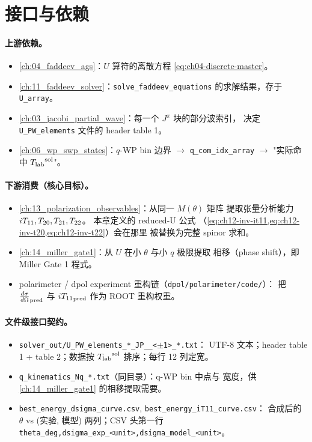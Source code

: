 \section{接口与依赖}
\label{sec:ch12-interface}

\paragraph{上游依赖。}
\begin{itemize}
  \item \cref{ch:04_faddeev_ags}：\(U\) 算符的离散方程
        \cref{eq:ch04-discrete-master}。
  \item \cref{ch:11_faddeev_solver}：\texttt{solve\_faddeev\_equations}
        的求解结果，存于 \texttt{U\_array}。
  \item \cref{ch:03_jacobi_partial_wave}：每一个 \(J^\pi\) 块的部分波索引，
        决定 \texttt{U\_PW\_elements} 文件的 header table 1。
  \item \cref{ch:06_wp_swp_states}：\(q\)-WP bin 边界 \(\to\) \texttt{q\_com\_idx\_array}
        \(\to\) "实际命中 \({T_{\text{lab}}}^{\rm sol}\)"。
\end{itemize}

\paragraph{下游消费（核心目标）。}
\begin{itemize}
  \item \cref{ch:13_polarization_observables}：从同一 \(M(\theta)\) 矩阵
        提取张量分析能力 \({i T_{11}}, {T_{20}}, {T_{21}}, {T_{22}}\)。
        本章定义的 reduced-U 公式
        （\cref{eq:ch12-inv-it11,eq:ch12-inv-t20,eq:ch12-inv-t22}）会在那里
        被替换为完整 spinor 求和。
  \item \cref{ch:14_miller_gate1}：从 \(U\) 在小 \(\theta\) 与小 \(q\) 极限提取
        相移（phase shift），即 Miller Gate 1 程式。
  \item polarimeter / dpol experiment 重构链（\texttt{dpol/polarimeter/code/}）：
        把 \(\frac{d\sigma}{d\Omega}_{\rm pred}\) 与 \({i T_{11}}_{\rm pred}\) 作为 ROOT
        重构权重。
\end{itemize}

\paragraph{文件级接口契约。}
\begin{itemize}
  \item \texttt{solver\_out/U\_PW\_elements\_*\_JP\_<2J>\_<\(\pm\)1>\_*.txt}：
        UTF-8 文本；header table 1 + table 2；数据按 \({T_{\text{lab}}}^{\rm sol}\)
        排序；每行 12 列定宽。
  \item \texttt{q\_kinematics\_Nq\_*.txt}（同目录）：q-WP bin 中点与
        宽度，供 \cref{ch:14_miller_gate1} 的相移提取需要。
  \item \texttt{best\_energy\_dsigma\_curve.csv}, \texttt{best\_energy\_iT11\_curve.csv}：
        合成后的 \(\theta\) vs (实验, 模型) 两列；CSV 头第一行
        \texttt{theta\_deg,dsigma\_exp\_<unit>,dsigma\_model\_<unit>}。
\end{itemize}


